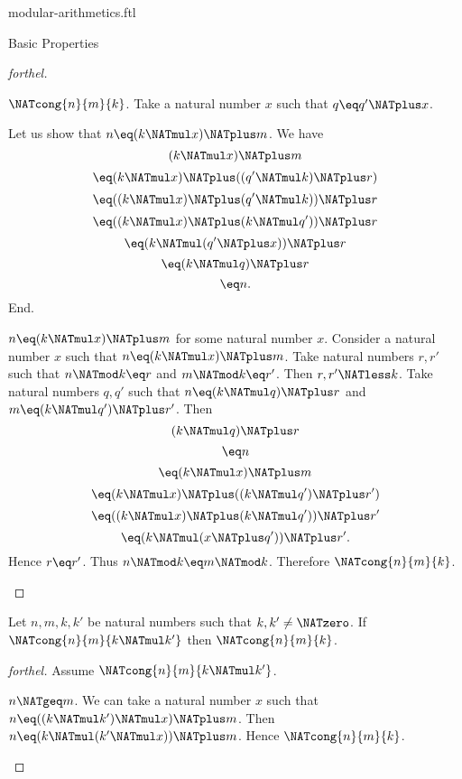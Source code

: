 \documentclass{naproche-library}
\begin{document}
\begin{smodule}[title=Modular Arithmetics]{modular-arithmetics.ftl}
\begin{sfragment}{Basic Properties}
\begin{proof}[forthel]
\begin{case}{$\NATcong{n}{m}{k}$.}
      Take a natural number $x$ such that $q \eq q' \NATplus x$.

      Let us show that $n \eq (k \NATmul x) \NATplus m$.
        We have
        \[  (k \NATmul x) \NATplus m                       \]
        \[    \eq (k \NATmul x) \NATplus ((q' \NATmul k) \NATplus r)  \]
        \[    \eq ((k \NATmul x) \NATplus (q' \NATmul k)) \NATplus r  \]
        \[    \eq ((k \NATmul x) \NATplus (k \NATmul q')) \NATplus r  \]
        \[    \eq (k \NATmul (q' \NATplus x)) \NATplus r            \]
        \[    \eq (k \NATmul q) \NATplus r                   \]
        \[    \eq n.                                \]
      End.
    \end{case}

    \begin{case}{$n \eq (k \NATmul x) \NATplus m$ for some natural number $x$.}
      Consider a natural number $x$ such that $n \eq (k \NATmul x) \NATplus m$.
      Take natural numbers $r, r'$ such that $n \NATmod k \eq r$ and $m \NATmod k \eq r'$.
      Then $r, r' \NATless k$.
      Take natural numbers $q, q'$ such that $n \eq (k \NATmul q) \NATplus r$ and $m \eq (k \NATmul q') \NATplus r'$.
      Then
      \[  (k \NATmul q) \NATplus r                         \]
      \[    \eq n                                   \]
      \[    \eq (k \NATmul x) \NATplus m                     \]
      \[    \eq (k \NATmul x) \NATplus ((k \NATmul q') \NATplus r')   \]
      \[    \eq ((k \NATmul x) \NATplus (k \NATmul q')) \NATplus r'   \]
      \[    \eq (k \NATmul (x \NATplus q')) \NATplus r'.            \]
      Hence $r \eq r'$.
      Thus $n \NATmod k \eq m \NATmod k$.
      Therefore $\NATcong{n}{m}{k}$.
    \end{case}
  \end{proof}

  \begin{proposition}[forthel,id=ARITHMETIC_08_2988318228742144]
    Let $n, m, k, k'$ be natural numbers such that $k, k' \neq \NATzero$.
    If $\NATcong{n}{m}{k \NATmul k'}$ then $\NATcong{n}{m}{k}$.
  \end{proposition}
  \begin{proof}[forthel]
    Assume $\NATcong{n}{m}{k \NATmul k'}$.

    \begin{case}{$n \NATgeq m$.}
      We can take a natural number $x$ such that $n \eq ((k \NATmul k') \NATmul x) \NATplus m$.
      Then $n \eq (k \NATmul (k' \NATmul x)) \NATplus m$.
      Hence $\NATcong{n}{m}{k}$.
    \end{case}


\end{proof}
\end{sfragment}
\end{smodule}
\end{document}
